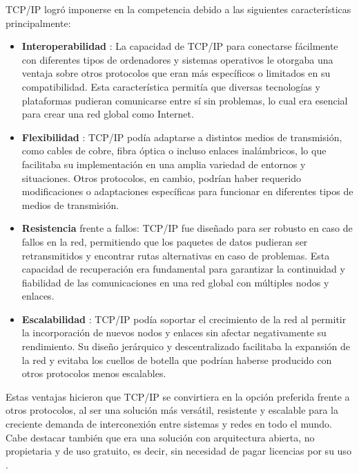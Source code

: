 TCP/IP logró imponerse en la competencia debido a las siguientes características principalmente:
\begin{itemize}
      \item \textbf{ Interoperabilidad }: La capacidad de TCP/IP para conectarse fácilmente con diferentes tipos de ordenadores y sistemas operativos le otorgaba una ventaja sobre otros protocolos que eran más específicos o limitados en su compatibilidad. Esta característica permitía que diversas tecnologías y plataformas pudieran comunicarse entre sí sin problemas, lo cual era esencial para crear una red global como Internet.

      \item \textbf{ Flexibilidad }: TCP/IP podía adaptarse a distintos medios de transmisión, como cables de cobre, fibra óptica o incluso enlaces inalámbricos, lo que facilitaba su implementación en una amplia variedad de entornos y situaciones. Otros protocolos, en cambio, podrían haber requerido modificaciones o adaptaciones específicas para funcionar en diferentes tipos de medios de transmisión.

      \item \textbf{ Resistencia }frente a fallos: TCP/IP fue diseñado para ser robusto en caso de fallos en la red, permitiendo que los paquetes de datos pudieran ser retransmitidos y encontrar rutas alternativas en caso de problemas. Esta capacidad de recuperación era fundamental para garantizar la continuidad y fiabilidad de las comunicaciones en una red global con múltiples nodos y enlaces.

      \item \textbf{ Escalabilidad }: TCP/IP podía soportar el crecimiento de la red al permitir la incorporación de nuevos nodos y enlaces sin afectar negativamente su rendimiento. Su diseño jerárquico y descentralizado facilitaba la expansión de la red y evitaba los cuellos de botella que podrían haberse producido con otros protocolos menos escalables.

\end{itemize}

Estas ventajas hicieron que TCP/IP se convirtiera en la opción preferida frente a otros protocolos, al ser una solución más versátil,
resistente y escalable para la creciente demanda de interconexión entre sistemas y redes en todo el mundo.
Cabe destacar también que era una solución con arquitectura abierta, no propietaria y de uso gratuito, es decir, sin necesidad de pagar licencias por su uso \cite{edwardsFoundationInternetTCP2021}.

